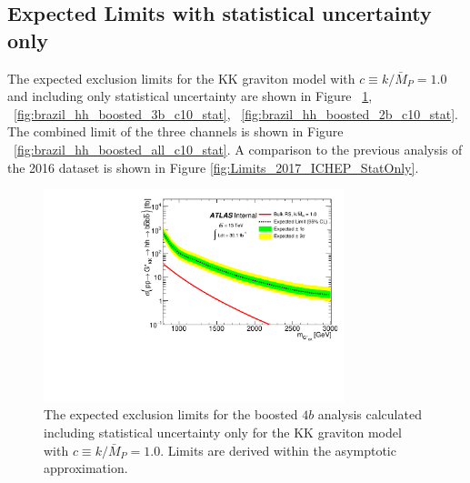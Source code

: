 \pagebreak{}
\subsection{Expected Limits with statistical uncertainty only}
\label{sec:expectedlimits_stat}

The expected exclusion limits for the KK graviton model with  $c \equiv k/\bar{M}_P = 1.0$
and including only statistical uncertainty are shown in Figure ~\ref{fig:brazil_hh_boosted_4b_c10_stat}, ~\ref{fig:brazil_hh_boosted_3b_c10_stat}, ~\ref{fig:brazil_hh_boosted_2b_c10_stat}. The combined limit of the three channels is shown in Figure ~\ref{fig:brazil_hh_boosted_all_c10_stat}. A comparison to the previous analysis of the 2016 dataset is shown in Figure \ref{fig:Limits_2017_ICHEP_StatOnly}.

\begin{figure}
\begin{center}
\includegraphics[angle=270, width=0.78\textwidth]{figures/boosted/Limit_Stat/BrazilPlot_Asymptotic_RSGC10_merged_2b.pdf}
\caption{The expected exclusion limits for the boosted $4b$ analysis calculated including statistical uncertainty only
for the KK graviton model with $c \equiv k/\bar{M}_P = 1.0$. Limits are derived within the asymptotic approximation.}
\label{fig:brazil_hh_boosted_4b_c10_stat}
\end{center}
\end{figure}

